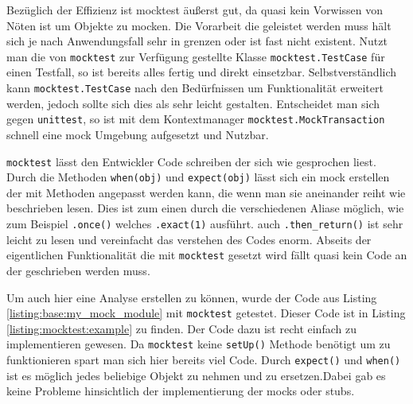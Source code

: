 Bezüglich der Effizienz ist mocktest äußerst gut, da quasi kein Vorwissen von Nöten ist um Objekte zu \gls{mock}en. Die
Vorarbeit die geleistet werden muss hält sich je nach Anwendungsfall sehr in grenzen oder ist fast nicht existent. Nutzt
man die von \lstinline{mocktest} zur Verfügung gestellte Klasse \lstinline{mocktest.TestCase} für einen Testfall, so ist
bereits alles fertig und direkt einsetzbar. Selbstverständlich kann \lstinline{mocktest.TestCase} nach den Bedürfnissen
um Funktionalität erweitert werden, jedoch sollte sich dies als sehr leicht gestalten. Entscheidet man sich gegen
\lstinline{unittest}, so ist mit dem Kontextmanager \lstinline{mocktest.MockTransaction} schnell eine \Gls{mock}
Umgebung aufgesetzt und Nutzbar.

\lstinline{mocktest} lässt den Entwickler Code schreiben der sich wie gesprochen liest. Durch die Methoden
\lstinline{when(obj)} und \lstinline{expect(obj)} lässt sich ein \Gls{mock} erstellen der mit Methoden angepasst werden
kann, die wenn man sie aneinander reiht wie beschrieben lesen. Dies ist zum einen durch die verschiedenen Aliase möglich,
wie zum Beispiel \lstinline{.once()} welches \lstinline{.exact(1)} ausführt. auch \lstinline{.then_return()} ist sehr
leicht zu lesen und vereinfacht das verstehen des Codes enorm. Abseits der eigentlichen Funktionalität die mit
\lstinline{mocktest} gesetzt wird fällt quasi kein Code an der geschrieben werden muss.

Um auch hier eine Analyse erstellen zu können, wurde der Code aus Listing \ref{listing:base:my_mock_module} mit
\lstinline{mocktest} getestet. Dieser Code ist in Listing \ref{listing:mocktest:example} zu finden.
Der Code dazu ist recht einfach zu implementieren gewesen. Da \lstinline{mocktest} keine
\lstinline{setUp()} Methode benötigt um zu funktionieren spart man sich hier bereits viel Code. Durch
\lstinline{expect()} und \lstinline{when()} ist es möglich jedes beliebige Objekt zu nehmen und zu
ersetzen.Dabei gab es keine Probleme hinsichtlich der implementierung der \Glspl{mock} oder
\Glspl{stub}.